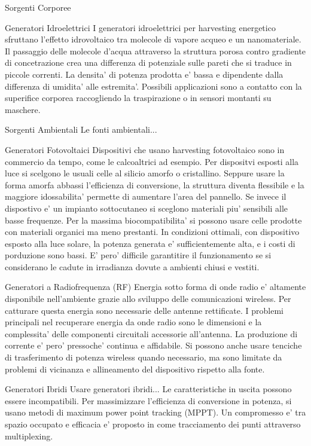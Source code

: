 \begin{section}{Sorgenti Corporee}
   \begin{subsection}{Generatori Idroelettrici}
    I generatori idroelettrici per harvesting energetico sfruttano l'effetto idrovoltaico tra molecole di vapore acqueo e un nanomateriale. Il passaggio delle molecole d'acqua attraverso la struttura porosa contro gradiente di concetrazione crea una differenza di potenziale sulle pareti che si traduce in piccole correnti. La densita' di potenza prodotta e' bassa e dipendente dalla differenza di umidita' alle estremita'. Possibili applicazioni sono a contatto con la superifice corporea raccogliendo la traspirazione o in sensori montanti su maschere. 
   \end{subsection}
\end{section}


\begin{section}{Sorgenti Ambientali}
    Le fonti ambientali...
    \begin{subsection}{Generatori Fotovoltaici}
    Dispositivi che usano harvesting fotovoltaico sono in commercio da tempo, come le calcoaltrici ad esempio. Per dispositvi esposti alla luce si scelgono le usuali celle al silicio amorfo o cristallino. Seppure usare la forma amorfa abbassi l'efficienza di conversione, la struttura diventa flessibile e la maggiore idossabilita' permette di aumentare l'area del pannello. Se invece il dispostivo e' un impianto sottocutaneo si sceglono materiali piu' sensibili alle basse frequenze. Per la massima biocompatibilita' si possono usare celle prodotte con materiali organici ma meno prestanti. In condizioni ottimali, con dispositivo esposto alla luce solare, la potenza generata e' sufficientemente alta, e i costi di porduzione sono bassi. E' pero' difficile garantitire il funzionamento se si considerano le cadute in irradianza dovute a ambienti chiusi e vestiti.
    \end{subsection}

    \begin{subsection}{Generatori a Radiofrequenza (RF)}
    Energia sotto forma di onde radio e' altamente disponibile nell'ambiente grazie allo sviluppo delle comunicazioni wireless. Per catturare questa energia sono necessarie delle antenne rettificate. I problemi principali nel recuperare energia da onde radio sono le dimensioni e la complessita' delle componenti circuitali accessorie all'antenna. La produzione di corrente e' pero' pressoche' continua e affidabile. Si possono anche usare tenciche di trasferimento di potenza wireless quando necessario, ma sono limitate da problemi di vicinanza e allineamento del dispositivo rispetto alla fonte. 
    \end{subsection}
\end{section}

\begin{section}{Generatori Ibridi}
    Usare generatori ibridi... 
    Le caratteristiche in uscita possono essere incompatibili.\cite{shaukatApplicationsSustainableHybrid2023} 
    Per massimizzare l'efficienza di conversione in potenza, si usano metodi di maximum power point tracking (MPPT). Un compromesso e' tra spazio occupato e efficacia e' proposto in \cite{liuMPPTMultiplexedHybrid2023} come tracciamento dei punti attraverso multiplexing.
\end{section}
